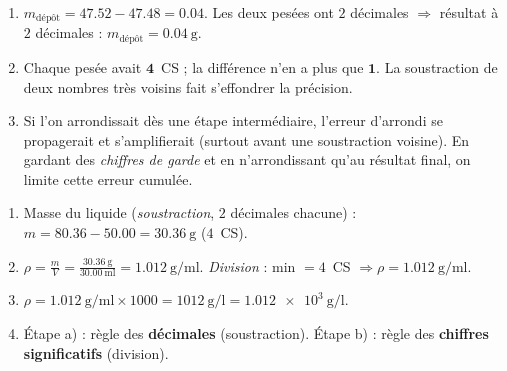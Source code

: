 \documentclass[11pt,a4paper]{article}
\newcommand{\CS}{chiffres significatifs}
\begin{document}
\begin{cor}
\begin{enumerate}[label=\alph*),leftmargin=1.6em,itemsep=1pt]
  \item $m_{\text{dépôt}}=\num{47,52}-\num{47,48}=\num{0,04}$. Les deux pesées ont $2$ décimales
        $\Rightarrow$ résultat à $2$ décimales : $\boxed{m_{\text{dépôt}}=\qty{0,04}{\gram}}$.
  \item Chaque pesée avait $\mathbf{4}$~CS ; la différence n'en a plus que $\mathbf{1}$. La
        soustraction de deux nombres très voisins fait s'effondrer la précision.
  \item Si l'on arrondissait dès une étape intermédiaire, l'erreur d'arrondi se propagerait et
        s'amplifierait (surtout avant une soustraction voisine). En gardant des \emph{chiffres de
        garde} et en n'arrondissant qu'au résultat final, on limite cette erreur cumulée.
\end{enumerate}
\end{cor}

\begin{cor}
\begin{enumerate}[label=\alph*),leftmargin=1.6em,itemsep=1pt]
  \item Masse du liquide (\emph{soustraction}, $2$ décimales chacune) :
        $m=\num{80,36}-\num{50,00}=\qty{30,36}{\gram}$ ($4$~CS).
  \item $\displaystyle \rho=\frac{m}{V}=\frac{\qty{30,36}{\gram}}{\qty{30,00}{\milli\litre}}
        =\num{1,012}\ \si{\gram\per\milli\litre}$. \emph{Division} : min $=4$~CS
        $\Rightarrow \boxed{\rho=\qty{1,012}{\gram\per\milli\litre}}$.
  \item $\rho=\qty{1,012}{\gram\per\milli\litre}\times\num{1000}=\qty{1012}{\gram\per\litre}
        =\num{1,012e3}\ \si{\gram\per\litre}$.
  \item Étape a) : règle des \textbf{décimales} (soustraction). Étape b) : règle des \textbf{\CS}
        (division).
\end{enumerate}
\end{cor}
\end{document}
